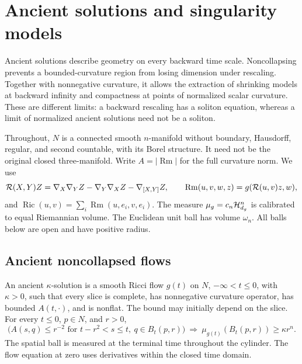 \chapter{Ancient solutions and singularity models}
\label{ch:ancient-models}

Ancient solutions describe geometry on every backward time scale.
Noncollapsing prevents a bounded-curvature region from losing dimension
under rescaling.  Together with nonnegative curvature, it allows the
extraction of shrinking models at backward infinity and compactness at
points of normalized scalar curvature.  These are different limits:
a backward rescaling has a soliton equation, whereas a limit of
normalized ancient solutions need not be a soliton.

Throughout, $N$ is a connected smooth $n$-manifold without boundary,
Hausdorff, regular, and second countable, with its Borel structure.
It need not be the original closed three-manifold.  Write
$A=|\operatorname{Rm}|$ for the full curvature norm.  We use
\[
 {\cal R}(X,Y)Z=\nabla_X\nabla_YZ-\nabla_Y\nabla_XZ-\nabla_{[X,Y]}Z,
 \qquad \operatorname{Rm}(u,v,w,z)=g({\cal R}(u,v)z,w),
\]
and $\operatorname{Ric}(u,v)=\sum_i\operatorname{Rm}(u,e_i,v,e_i)$.
The measure $\mu_g=c_n{\cal H}^n_{d_g}$ is calibrated to equal
Riemannian volume.  The Euclidean unit ball has volume $\omega_n$.
All balls below are open and have positive radius.

\section{Ancient noncollapsed flows}

\begin{definition}
\label{def:ancient-kappa}
An ancient $\kappa$-solution is a smooth Ricci flow $g(t)$ on $N$,
$-\infty<t\leq0$, with $\kappa>0$, such that every slice is complete,
has nonnegative curvature operator, has bounded $A(t,\cdot)$, and is
nonflat.  The bound may initially depend on the slice.  For every
$t\leq0$, $p\in N$, and $r>0$,
\[
 \bigl(A(s,q)\leq r^{-2}\text{ for }t-r^2<s\leq t,\
          q\in B_t(p,r)\bigr)
 \ \Longrightarrow\ \mu_{g(t)}(B_t(p,r))\geq\kappa r^n .
\]
The spatial ball is measured at the terminal time throughout the cylinder.
The flow equation at zero uses derivatives within the closed time domain.
\lean{PoincareMT.AncientKappaSolution}
\end{definition}

